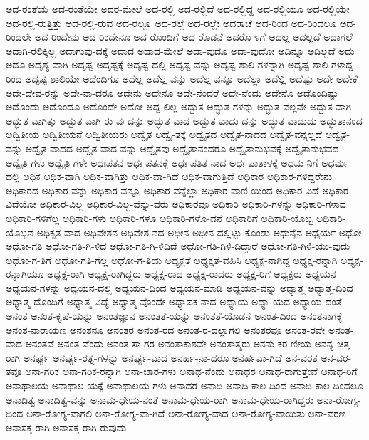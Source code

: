 {ಅದ-ರಂತೆಯೆ
ಅದ-ರಂತೆಯೇ
ಅದರ-ಮೇಲೆ
ಅದ-ರಲ್ಲಿ
ಅದ-ರಲ್ಲಿದೆ
ಅದ-ರಲ್ಲಿದ್ದ
ಅದ-ರಲ್ಲಿಯೂ
ಅದ-ರಲ್ಲಿಯೇ
ಅದ-ರಲ್ಲಿ-ರುತ್ತಿತ್ತು
ಅದ-ರಲ್ಲಿ-ರುವ
ಅದ-ರಲ್ಲೂ
ಅದ-ರಲ್ಲೆ
ಅದ-ರಲ್ಲೇ
ಅದರಾಚೆ
ಅದ-ರಿಂದ
ಅದ-ರಿಂದಲೂ
ಅದ-ರಿಂದಲೇ
ಅದ-ರಿಂದೇನು
ಅದ-ರಿಂದೇನೂ
ಅದ-ರೊಂದಿಗೆ
ಅದ-ರೊಡನೆ
ಅದರೊ-ಳಗೆ
ಅದಲ್ಲ
ಅದಲ್ಲದೆ
ಅದಾಗಲೆ
ಅದಾಗಿ-ರಲಿಕ್ಕಿಲ್ಲ
ಅದಾಗುವು-ದಕ್ಕೆ
ಅದಾದ
ಅದಾದ-ಮೇಲೆ
ಅದಾ-ವುದೂ
ಅದಾ-ವುದೋ
ಅದಿನ್ನೂ
ಅದಿಲ್ಲದೆ
ಅದು
ಅದೂ
ಅದೃಶ್ಯ-ವಾಗಿ
ಅದೃಷ್ಟ
ಅದೃಷ್ಟಕ್ಕೆ
ಅದೃಷ್ಟ-ದಲ್ಲಿ
ಅದೃಷ್ಟ-ವನ್ನು
ಅದೃಷ್ಟ-ಶಾಲಿ-ಗಳನ್ನಾಗಿ
ಅದೃಷ್ಟ-ಶಾಲಿ-ಗಳಾದ್ದ-ರಿಂದ
ಅದೃಷ್ಟ-ಶಾಲಿಯೇ
ಅದೆಂದಿಗೂ
ಅದೆಲ್ಲ
ಅದೆಲ್ಲ-ವನ್ನು
ಅದೆಲ್ಲ-ವನ್ನೂ
ಅದೆಲ್ಲಾ
ಅದೆಲ್ಲಿ
ಅದೆಷ್ಟು
ಅದೇ
ಅದೇಕೆ
ಅದೇ-ದೇವ-ರನ್ನು
ಅದೇ-ನಾ-ದರೂ
ಅದೇನು
ಅದೇನೂ
ಅದೇ-ನೆಂದರೆ
ಅದೇ-ನೆಂದು
ಅದೇನೊ
ಅದೊಂದಿಷ್ಟು
ಅದೊಂದು
ಅದೊಂದೂ
ಅದೊಂದೇ
ಅದೋ
ಅದ್ದ-ಲಿಲ್ಲ
ಅದ್ಭುತ
ಅದ್ಭುತ-ಗಳನ್ನು
ಅದ್ಭುತ-ವಲ್ಲವೇ
ಅದ್ಭುತ-ವಾಗಿ
ಅದ್ಭುತ-ವಾಗಿತ್ತು
ಅದ್ಭುತ-ವಾಗಿ-ರು-ವು-ದನ್ನು
ಅದ್ಭುತ-ವಾದ
ಅದ್ಭುತ-ವಾದು-ದನ್ನು
ಅದ್ಭುತ-ವಾದುದು
ಅದ್ಭುತಾನಂದ
ಅದ್ವಿತೀಯ
ಅದ್ವಿತೀಯನೆ
ಅದ್ವಿತೀಯರು
ಅದ್ವೈತ
ಅದ್ವೈ-ತಕ್ಕೆ
ಅದ್ವೈತದ
ಅದ್ವೈತ-ನಾದದ
ಅದ್ವೈತ-ವನ್ನಲ್ಲದೆ
ಅದ್ವೈತ-ವನ್ನು
ಅದ್ವೈತ-ವಾದದ
ಅದ್ವೈತ-ವಾದ-ವನ್ನು
ಅದ್ವೈತವು
ಅದ್ವೈತಾನಂದರೂ
ಅದ್ವೈತಾನುಭವಕ್ಕೆ
ಅದ್ವೈತಾನುಭವದ
ಅದ್ವೈತಿ-ಗಳು
ಅದ್ವೈತಿ-ಗಳೇ
ಅಧಃಪತನ
ಅಧಃ-ಪತನಕ್ಕೆ
ಅಧಃ-ಪತಿತ-ನಾದ
ಅಧಃ-ಪಾತಾಳಕ್ಕೆ
ಅಧಮ-ನಿಗೆ
ಅಧರ್ಮ-ದಲ್ಲಿ
ಅಧಿಕ
ಅಧಿಕ-ವಾಗಿ
ಅಧಿಕ-ವಾಗಿತ್ತು
ಅಧಿಕ-ವಾ-ಗಿದೆ
ಅಧಿಕ-ವಾಗುತ್ತಿದೆ
ಅಧಿಕಾರ
ಅಧಿಕಾರ-ಗಳಿದ್ದರೇನು
ಅಧಿಕಾರದ
ಅಧಿಕಾರ-ವನ್ನು
ಅಧಿಕಾರ-ವನ್ನೂ
ಅಧಿಕಾರ-ವನ್ನೆಲ್ಲಾ
ಅಧಿಕಾರ-ವಾಣಿ-ಯಿಂದ
ಅಧಿಕಾರ-ವಿದೆ
ಅಧಿಕಾರ-ವಿದೆಯೋ
ಅಧಿಕಾರ-ವಿಲ್ಲ
ಅಧಿಕಾರ-ವಿಲ್ಲ-ವೆನ್ನು-ವರು
ಅಧಿಕಾರವೂ
ಅಧಿಕಾರಿ
ಅಧಿಕಾರಿ-ಗಳನ್ನು
ಅಧಿಕಾರಿ-ಗಳಾದ
ಅಧಿಕಾರಿ-ಗಳಿಗೆಲ್ಲ
ಅಧಿಕಾರಿ-ಗಳು
ಅಧಿಕಾರಿ-ಗಳೂ
ಅಧಿಕಾರಿ-ಗಳೊ-ಡನೆ
ಅಧಿಕಾರಿಗೆ
ಅಧಿಕಾರಿ-ಯೊಬ್ಬ
ಅಧಿಕಾರಿ-ಯೊಬ್ಬನ
ಅಧಿಕೃತ-ವಾದ
ಅಧಿವೇಶನ
ಅಧಿವೇಶ-ನದ
ಅಧೀನ
ಅಧೀನ-ದಲ್ಲಿಟ್ಟು-ಕೊಂಡು
ಅಧುನೈನ
ಅಧೈರ್ಯ
ಅಧೋ
ಅಧೋ-ಗತಿ
ಅಧೋ-ಗತಿ-ಗಿ-ಳಿದ
ಅಧೋ-ಗತಿ-ಗಿ-ಳಿದಿದೆ
ಅಧೋ-ಗತಿ-ಗಿಳಿ-ದಿದ್ದಾರೆ
ಅಧೋ-ಗತಿ-ಗಿಳಿ-ಯು-ವುದು
ಅಧೋ-ಗ-ತಿಗೆ
ಅಧೋ-ಗತಿ-ಗೆಲ್ಲ
ಅಧೋ-ಗ-ತಿಯ
ಅಧ್ಯಕ್ಷತೆ
ಅಧ್ಯಕ್ಷತೆ-ವಹಿಸಿ
ಅಧ್ಯಕ್ಷ-ನಾಗಿದ್ದ
ಅಧ್ಯಕ್ಷ-ರನ್ನಾಗಿ
ಅಧ್ಯಕ್ಷ-ರನ್ನಾಗಿಯೂ
ಅಧ್ಯಕ್ಷ-ರಾಗಿ
ಅಧ್ಯಕ್ಷ-ರಾಗಿದ್ದರು
ಅಧ್ಯಕ್ಷ-ರಾದ
ಅಧ್ಯಕ್ಷ-ರಾದರು
ಅಧ್ಯಕ್ಷ-ರಿಗೆ
ಅಧ್ಯಕ್ಷರು
ಅಧ್ಯಯನ
ಅಧ್ಯಯನ-ಗಳನ್ನು
ಅಧ್ಯಯನ-ದಲ್ಲಿ
ಅಧ್ಯಯನ-ದಿಂದ
ಅಧ್ಯಯನ-ಮಾಡಿ
ಅಧ್ಯಯನ-ವನ್ನು
ಅಧ್ಯಾತ್ಮ
ಅಧ್ಯಾತ್ಮ-ದಿಂದ
ಅಧ್ಯಾತ್ಮ-ದೊಂದಿಗೆ
ಅಧ್ಯಾತ್ಮ-ವಿದ್ಯೆ
ಅಧ್ಯಾತ್ಮ-ವೊಂದೇ
ಅಧ್ಯಾಪಕ-ನಾದ
ಅಧ್ಯಾಯ
ಅಧ್ಯಾ-ಯದ
ಅಧ್ಯಾಯ-ದಂತೆ
ಅನಂತ
ಅನಂತ-ಕೃಪೆ-ಯನ್ನು
ಅನಂತಜ್ಞಾನ
ಅನಂತತೆ-ಯನ್ನು
ಅನಂತತೆ-ಯೊಡನೆ
ಅನಂತ-ದಿಂದ
ಅನಂತನಾಗಕ್ಕೆ
ಅನಂತ-ನಾರಾಯಣ
ಅನಂತನೂ
ಅನಂತರ
ಅನಂತ-ರದ
ಅನಂತ-ರ-ದಲ್ಲಾಗಲಿ
ಅನಂತರವೂ
ಅನಂತ-ರವೇ
ಅನಂತ-ವಾದ
ಅನಂತವೆ
ಅನಂತ-ವೆಂದು
ಅನಂತ-ಸಾ-ಗರ
ಅನಂತಾಕಾಶವೇ
ಅನಂತಾತ್ಮರು
ಅನನು-ಕರ-ಣೀಯ
ಅನನ್ಯ-ಚಿತ್ತ-ರಾಗಿ
ಅನರ್ಘ್ಯ
ಅನರ್ಘ್ಯ-ರತ್ನ-ಗಳನ್ನು
ಅನರ್ಘ್ಯ-ವಾದ
ಅನರ್ಹ-ನಾ-ದರೂ
ಅನರ್ಹವಾ-ಗಿದೆ
ಅನ-ವರತ
ಅನ-ವರ-ತವೂ
ಅನಾ-ಗರಿಕ
ಅನಾ-ಗರಿಕ-ರನ್ನಾಗಿ
ಅನಾ-ಚಾರ-ಗಳು
ಅನಾಥ-ನೆಂದು
ಅನಾಥರ
ಅನಾಥ-ರಾಗುತ್ತೇವೆ
ಅನಾಥ-ರಿಗೆ
ಅನಾಥಾಲಯ
ಅನಾಥಾಲ-ಯಕ್ಕೆ
ಅನಾಥಾಲಯ-ಗಳು
ಅನಾದರ
ಅನಾದಿ
ಅನಾದಿ-ಕಾಲ-ದಿಂದ
ಅನಾದಿ-ಕಾಲ-ದಿಂದಲೂ
ಅನಾದಿತ್ವ
ಅನಾದಿತ್ವ-ವನ್ನು
ಅನಾಮ-ಧೇಯ-ನಂತೆ
ಅನಾಮ-ಧೇಯ-ರಾಗಿ
ಅನಾಮ-ಧೇಯ-ರಾಗಿದ್ದರು
ಅನಾ-ರೋಗ್ಯ-ದಿಂದ
ಅನಾ-ರೋಗ್ಯ-ವಾಗಲಿ
ಅನಾ-ರೋಗ್ಯ-ವಾ-ಗಿದೆ
ಅನಾ-ರೋಗ್ಯ-ವಾದ
ಅನಾ-ರೋಗ್ಯ-ವಾಯಿತು
ಅನಾ-ವರಣ
ಅನಾಸಕ್ತ-ರಾಗಿ
ಅನಾಸಕ್ತ-ರಾಗಿ-ರುವುದು
}
